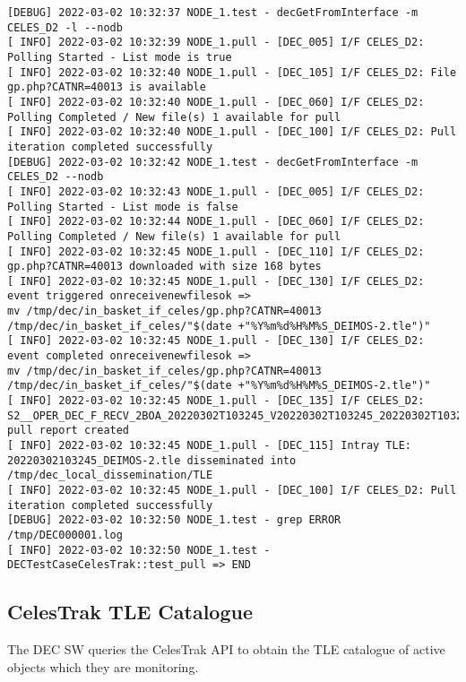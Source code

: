 \documentclass[dec_sum_main.tex]{subfiles}
\begin{document}
\begin{Verbatim}[fontsize=\tiny]
[DEBUG] 2022-03-02 10:32:37 NODE_1.test - decGetFromInterface -m CELES_D2 -l --nodb
[ INFO] 2022-03-02 10:32:39 NODE_1.pull - [DEC_005] I/F CELES_D2: Polling Started - List mode is true
[ INFO] 2022-03-02 10:32:40 NODE_1.pull - [DEC_105] I/F CELES_D2: File gp.php?CATNR=40013 is available
[ INFO] 2022-03-02 10:32:40 NODE_1.pull - [DEC_060] I/F CELES_D2: Polling Completed / New file(s) 1 available for pull
[ INFO] 2022-03-02 10:32:40 NODE_1.pull - [DEC_100] I/F CELES_D2: Pull iteration completed successfully
[DEBUG] 2022-03-02 10:32:42 NODE_1.test - decGetFromInterface -m CELES_D2 --nodb
[ INFO] 2022-03-02 10:32:43 NODE_1.pull - [DEC_005] I/F CELES_D2: Polling Started - List mode is false
[ INFO] 2022-03-02 10:32:44 NODE_1.pull - [DEC_060] I/F CELES_D2: Polling Completed / New file(s) 1 available for pull
[ INFO] 2022-03-02 10:32:45 NODE_1.pull - [DEC_110] I/F CELES_D2: gp.php?CATNR=40013 downloaded with size 168 bytes
[ INFO] 2022-03-02 10:32:45 NODE_1.pull - [DEC_130] I/F CELES_D2: event triggered onreceivenewfilesok => 
mv /tmp/dec/in_basket_if_celes/gp.php?CATNR=40013 /tmp/dec/in_basket_if_celes/"$(date +"%Y%m%d%H%M%S_DEIMOS-2.tle")"
[ INFO] 2022-03-02 10:32:45 NODE_1.pull - [DEC_130] I/F CELES_D2: event completed onreceivenewfilesok => 
mv /tmp/dec/in_basket_if_celes/gp.php?CATNR=40013 /tmp/dec/in_basket_if_celes/"$(date +"%Y%m%d%H%M%S_DEIMOS-2.tle")"
[ INFO] 2022-03-02 10:32:45 NODE_1.pull - [DEC_135] I/F CELES_D2: S2__OPER_DEC_F_RECV_2BOA_20220302T103245_V20220302T103245_20220302T103245_CELES_D2.xml pull report created
[ INFO] 2022-03-02 10:32:45 NODE_1.pull - [DEC_115] Intray TLE: 20220302103245_DEIMOS-2.tle disseminated into /tmp/dec_local_dissemination/TLE
[ INFO] 2022-03-02 10:32:45 NODE_1.pull - [DEC_100] I/F CELES_D2: Pull iteration completed successfully
[DEBUG] 2022-03-02 10:32:50 NODE_1.test - grep ERROR /tmp/DEC000001.log
[ INFO] 2022-03-02 10:32:50 NODE_1.test - DECTestCaseCelesTrak::test_pull => END
\end{Verbatim}

\subsection{CelesTrak TLE Catalogue }
The DEC SW queries the CelesTrak API to obtain the TLE catalogue of active objects which they are monitoring.\newline
	
 \newline
\end{document}
